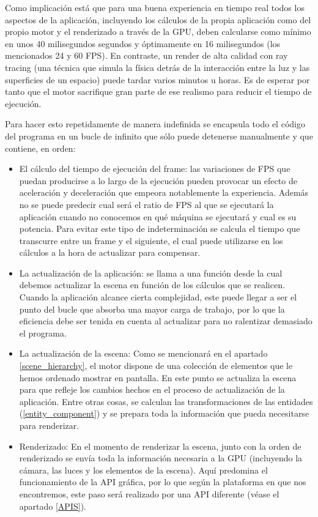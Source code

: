 Como implicación está que para una buena experiencia en tiempo real todos los aspectos de la aplicación, incluyendo los cálculos de la propia aplicación como del propio motor y el renderizado a través de la GPU, deben calcularse como mínimo en unos 40 milisegundos segundos y óptimamente en 16 milisegundos (los mencionados 24 y 60 FPS). En contraste, un render de alta calidad con ray tracing (una técnica que simula la física detrás de la interacción entre la luz y las superficies de un espacio) puede tardar varios minutos u horas. Es de esperar por tanto que el motor sacrifique gran parte de ese realismo para reducir el tiempo de ejecución.

Para hacer esto repetidamente de manera indefinida se encapsula todo el código del programa en un bucle de infinito que sólo puede detenerse manualmente y que contiene, en orden:

\begin{itemize}
    \item El cálculo del tiempo de ejecución del frame: las variaciones de FPS que puedan producirse a lo largo de la ejecución pueden provocar un efecto de aceleración y deceleración que empeora notablemente la experiencia. Además no se puede predecir cual será el ratio de FPS al que se ejecutará la aplicación cuando no conocemos en qué máquina se ejecutará y cual es su potencia. Para evitar este tipo de indeterminación se calcula el tiempo que transcurre entre un frame y el siguiente, el cual puede utilizarse en los cálculos a la hora de actualizar para compensar.
    \item La actualización de la aplicación: se llama a una función desde la cual debemos actualizar la escena en función de los cálculos que se realicen. Cuando la aplicación alcance cierta complejidad, este puede llegar a ser el punto del bucle que absorba una mayor carga de trabajo, por lo que la eficiencia debe ser tenida en cuenta al actualizar para no ralentizar demasiado el programa.
    \item La actualización de la escena: Como se mencionará en el apartado \ref{scene_hierarchy}, el motor dispone de una colección de elementos que le hemos ordenado mostrar en pantalla. En este punto se actualiza la escena para que refleje los cambios hechos en el proceso de actualización de la aplicación. Entre otras cosas, se calculan las transformaciones de las entidades (\ref{entity_component}) y se prepara toda la información que pueda necesitarse para renderizar.
    \item Renderizado: En el momento de renderizar la escena, junto con la orden de renderizado se envía toda la información necesaria a la GPU (incluyendo la cámara, las luces y los elementos de la escena). Aquí predomina el funcionamiento de la API gráfica, por lo que según la plataforma en que nos encontremos, este paso será realizado por una API diferente (véase el apartado \ref{APIS}).
\end{itemize}

